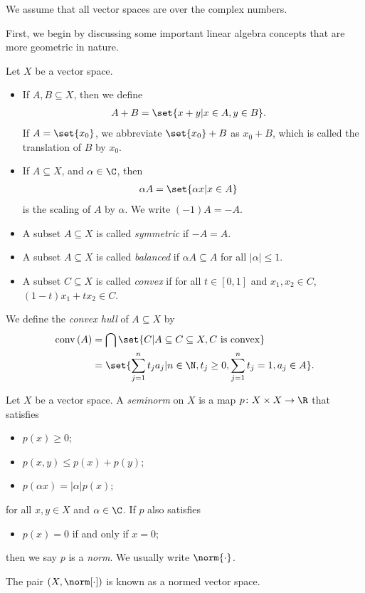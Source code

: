 \documentclass[10pt]{mypackage2}
\begin{document}
We assume that all vector spaces are over the complex numbers.\newline

First, we begin by discussing some important linear algebra concepts that are more geometric in nature.
\begin{definition}\label{def:vector_space_subset_operations}
  Let $X$ be a vector space.
  \begin{itemize}
    \item If $A,B\subseteq X$, then we define
      \begin{align*}
        A + B &= \set{x + y | x\in A,y\in B}.
      \end{align*}
      If $A = \set{x_0}$, we abbreviate $\set{x_0} + B$ as $x_0 + B$, which is called the translation of $B$ by $x_0$.
    \item If $A\subseteq X$, and $\alpha\in \C$, then
      \begin{align*}
        \alpha A &= \set{\alpha x | x\in A}
      \end{align*}
      is the scaling of $A$ by $\alpha$. We write $(-1)A = -A$.
    \item A subset $A\subseteq X$ is called \textit{symmetric} if $-A = A$.
    \item A subset $A\subseteq X$ is called \textit{balanced} if $\alpha A\subseteq A$ for all $\left\vert \alpha \right\vert\leq 1$.
    \item A subset $C\subseteq X$ is called \textit{convex} if for all $t\in [0,1]$ and $x_1,x_2\in C$, $\left(1-t\right)x_1 + tx_2 \in C$.
  \end{itemize}
  We define the \textit{convex hull} of $A\subseteq X$ by
  \begin{align*}
    \operatorname{conv}\left(A\right) &= \bigcap\set{C | A\subseteq C\subseteq X,C\text{ is convex}}\\
                                      &= \set{\sum_{j=1}^{n}t_ja_j | n\in\N,t_j\geq 0,\sum_{j=1}^{n}t_j = 1,a_j\in A}.
  \end{align*}
\end{definition}
\begin{definition}
  Let $X$ be a vector space. A \textit{seminorm} on $X$ is a map $p\colon X\times X\rightarrow \R$ that satisfies
  \begin{itemize}
    \item $p(x) \geq 0$;
    \item $p\left( x,y \right) \leq p\left( x \right) + p\left( y \right)$;
    \item $p\left( \alpha x \right) = \left\vert \alpha \right\vert p(x)$;
  \end{itemize}
  for all $x,y\in X$ and $\alpha\in \C$. If $p$ also satisfies
  \begin{itemize}
    \item $p\left( x \right) = 0$ if and only if $x = 0$;
  \end{itemize}
  then we say $p$ is a \textit{norm}. We usually write $\norm{\cdot}$.\newline

  The pair $\left( X,\norm[\cdot] \right)$ is known as a normed vector space.
\end{definition}
\end{document}

